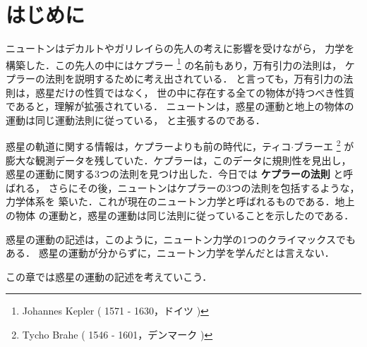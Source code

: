 ﻿%
    \section{はじめに}
        ニュートンはデカルトやガリレイらの先人の考えに影響を受けながら，
        力学を構築した．この先人の中にはケプラー
            \footnote{
                Johannes Kepler ( 1571 - 1630，ドイツ )
            }
        の名前もあり，万有引力の法則は，
        ケプラーの法則を説明するために考え出されている．
        と言っても，万有引力の法則は，惑星だけの性質ではなく，
        世の中に存在する全ての物体が持つべき性質であると，理解が拡張されている．
        ニュートンは，惑星の運動と地上の物体の運動は同じ運動法則に従っている，
        と主張するのである．

        惑星の軌道に関する情報は，ケプラーよりも前の時代に，ティコ$\cdot$ブラーエ
            \footnote{
                Tycho Brahe ( 1546 - 1601，デンマーク )
            }
        が膨大な観測データを残していた．ケプラーは，このデータに規則性を見出し，
        惑星の運動に関する3つの法則を見つけ出した．今日では \textbf{ケプラーの法則} と呼ばれる，
        さらにその後，ニュートンはケプラーの3つの法則を包括するような，力学体系を
        築いた．これが現在のニュートン力学と呼ばれるものである．地上の物体
        の運動と，惑星の運動は同じ法則に従っていることを示したのである．

        惑星の運動の記述は，このように，ニュートン力学の1つのクライマックスでもある．
        惑星の運動が分からずに，ニュートン力学を学んだとは言えない．

        この章では惑星の運動の記述を考えていこう．

